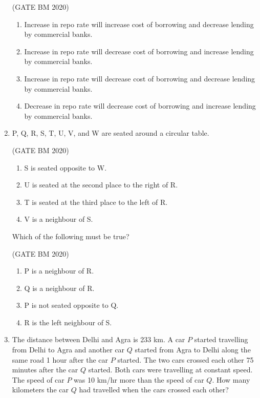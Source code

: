 \documentclass[journal]{IEEEtran}
\begin{document}
\begin{enumerate}
\hfill(GATE BM 2020)
\begin{enumerate}
  \item Increase in repo rate will increase cost of borrowing and decrease lending by commercial banks.
  \item Increase in repo rate will decrease cost of borrowing and increase lending by commercial banks.
  \item Increase in repo rate will decrease cost of borrowing and decrease lending by commercial banks.
  \item Decrease in repo rate will decrease cost of borrowing and increase lending by commercial banks.
\end{enumerate}



\item P, Q, R, S, T, U, V, and W are seated around a circular table.  


	\hfill(GATE BM 2020)
\begin{enumerate}
\item S is seated opposite to W.  
\item U is seated at the second place to the right of R.  
\item T is seated at the third place to the left of R.  
\item V is a neighbour of S.  
\end{enumerate}

Which of the following must be true?  


\hfill(GATE BM 2020)
\begin{enumerate}
  \item P is a neighbour of R.
  \item Q is a neighbour of R.
  \item P is not seated opposite to Q.
  \item R is the left neighbour of S.
\end{enumerate}



\item The distance between Delhi and Agra is 233 km. A car $P$ started travelling from Delhi to Agra and another car $Q$ started from Agra to Delhi along the same road 1 hour after the car $P$ started. The two cars crossed each other 75 minutes after the car $Q$ started. Both cars were travelling at constant speed. The speed of car $P$ was 10 km/hr more than the speed of car $Q$. How many kilometers the car $Q$ had travelled when the cars crossed each other?  



\end{enumerate}
\end{document}
